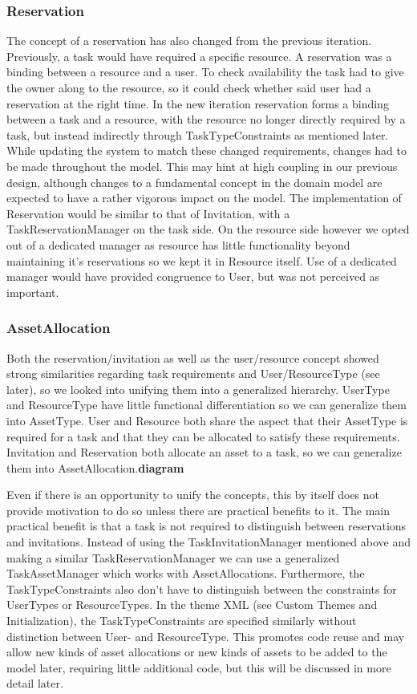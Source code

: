 			\subsubsection{Reservation}
				The concept of a reservation has also changed from the previous iteration. Previously, a task would have required a specific resource. A reservation was a binding between a resource and a user. To check availability the task had to give the owner along to the resource, so it could check whether said user had a reservation at the right time. In the new iteration reservation forms a binding between a task and a resource, with the resource no longer directly required by a task, but instead indirectly through TaskTypeConstraints as mentioned later. While updating the system to match these changed requirements, changes had to be made throughout the model. This may hint at high coupling in our previous design, although changes to a fundamental concept in the domain model are expected to have a rather vigorous impact on the model. The implementation of Reservation would be similar to that of Invitation, with a TaskReservationManager on the task side. On the resource side however we opted out of a dedicated manager as resource has little functionality beyond maintaining it's reservations so we kept it in Resource itself. Use of a dedicated manager would have provided congruence to User, but was not perceived as important. 
			
			\subsubsection{AssetAllocation}
				Both the reservation/invitation as well as the user/resource concept showed strong similarities regarding task requirements and User/ResourceType (see later), so we looked into unifying them into a generalized hierarchy. UserType and ResourceType have little functional differentiation so we can generalize them into AssetType. User and Resource both share the aspect that their AssetType is required for a task and that they can be allocated to satisfy these requirements. Invitation and Reservation both allocate an asset to a task, so we can generalize them into AssetAllocation.\textbf{diagram}
				
				Even if there is an opportunity to unify the concepts, this by itself does not provide motivation to do so unless there are practical benefits to it. The main practical benefit is that a task is not required to distinguish between reservations and invitations. Instead of using the TaskInvitationManager mentioned above and making a similar TaskReservationManager we can use a generalized TaskAssetManager which works with AssetAllocations. Furthermore, the TaskTypeConstraints also don't have to distinguish between the constraints for UserTypes or ResourceTypes. In the theme XML (see Custom Themes and Initialization), the TaskTypeConstraints are specified similarly without distinction between User- and ResourceType. This promotes code reuse and may allow new kinds of asset allocations or new kinds of assets to be added to the model later, requiring little additional code, but this will be discussed in more detail later.
				
